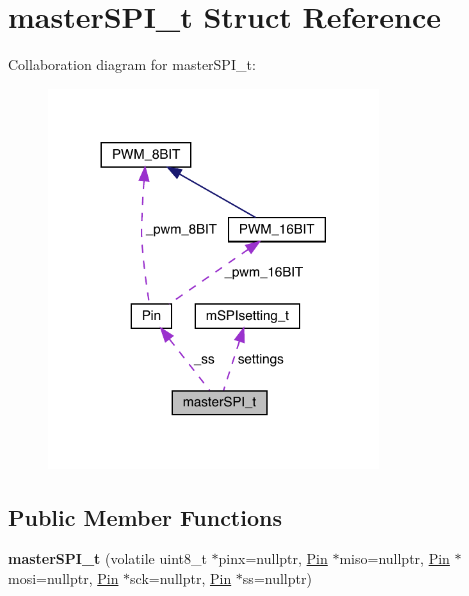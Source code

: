 \hypertarget{structmasterSPI__t}{}\section{master\+S\+P\+I\+\_\+t Struct Reference}
\label{structmasterSPI__t}


Collaboration diagram for master\+S\+P\+I\+\_\+t\+:\nopagebreak
\begin{figure}[H]
\begin{center}
\leavevmode
\includegraphics[width=248pt]{structmasterSPI__t__coll__graph}
\end{center}
\end{figure}
\subsection*{Public Member Functions}
\begin{DoxyCompactItemize}
\item 
\mbox{\label{structmasterSPI__t_a3344d8520f2e855f5ecf53bfe03415fe}} 
{\bfseries master\+S\+P\+I\+\_\+t} (volatile uint8\+\_\+t $\ast$pinx=nullptr, \mbox{\hyperlink{classPin}{Pin}} $\ast$miso=nullptr, \mbox{\hyperlink{classPin}{Pin}} $\ast$mosi=nullptr, \mbox{\hyperlink{classPin}{Pin}} $\ast$sck=nullptr, \mbox{\hyperlink{classPin}{Pin}} $\ast$ss=nullptr)
\end{DoxyCompactItemize}
